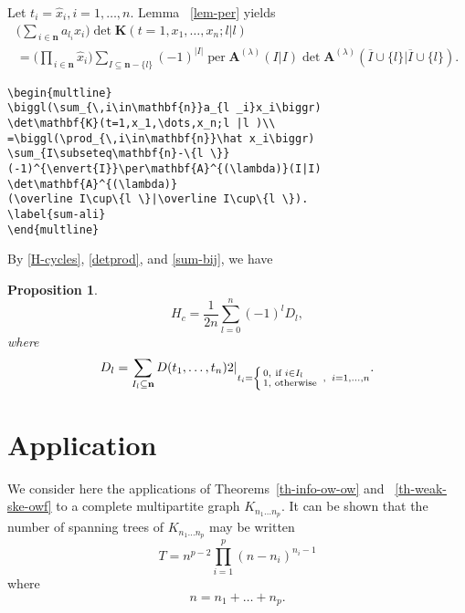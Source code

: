 \documentclass{article}
\newtheorem{prop}[thm]{Proposition}
\theoremstyle{definition}
\theoremstyle{remark}
\DeclareMathOperator{\per}{per}
\newcommand{\eval}[2][\right]{\relax
  \ifx#1\right\relax \left.\fi#2#1\rvert}
\newcommand{\envert}[1]{\left\lvert#1\right\rvert}
\begin{document}
Let $t_i=\hat x_i,i=1,\dots,n$. Lemma ~\ref{lem-per} yields
\begin{multline}
\biggl(\sum_{\,i\in\mathbf{n}}a_{l _i}x_i\biggr)
\det\mathbf{K}(t=1,x_1,\dots,x_n;l |l )\\
=\biggl(\prod_{\,i\in\mathbf{n}}\hat x_i\biggr)
\sum_{I\subseteq\mathbf{n}-\{l \}}
(-1)^{\envert{I}}\per\mathbf{A}^{(\lambda)}(I|I)
\det\mathbf{A}^{(\lambda)}
(\overline I\cup\{l \}|\overline I\cup\{l \}).
\label{sum-ali}
\end{multline}
\begin{verbatim}
\begin{multline}
\biggl(\sum_{\,i\in\mathbf{n}}a_{l _i}x_i\biggr)
\det\mathbf{K}(t=1,x_1,\dots,x_n;l |l )\\
=\biggl(\prod_{\,i\in\mathbf{n}}\hat x_i\biggr)
\sum_{I\subseteq\mathbf{n}-\{l \}}
(-1)^{\envert{I}}\per\mathbf{A}^{(\lambda)}(I|I)
\det\mathbf{A}^{(\lambda)}
(\overline I\cup\{l \}|\overline I\cup\{l \}).
\label{sum-ali}
\end{multline}
\end{verbatim}

By \eqref{H-cycles}, \eqref{detprod}, and \eqref{sum-bij}, we have
\begin{prop}\label{prop:eg}
\begin{equation}
H_c=\frac1{2n}\sum^n_{l =0}(-1)^{l}
D_{l},
\end{equation}
where
\begin{equation}\label{delta-l}
D_{l}=\eval[2]{\sum_{I_{l}\subseteq \mathbf{n}}
D(t_1,\dots,t_n)}_{t_i=\left\{\begin{smallmatrix}
0,& \text{if }i\in I_{l}\quad\\%
1,& \text{otherwise}\end{smallmatrix}\right.\;,\;\; i=1,\dots,n}.
\end{equation}
\end{prop}

\section{Application}
\label{lincomp}

We consider here the applications of Theorems~\ref{th-info-ow-ow} and
~\ref{th-weak-ske-owf} to a complete
multipartite graph $K_{n_1\dots n_p}$. It can be shown that the
number of spanning trees of $K_{n_1\dots n_p}$
may be written
\begin{equation}\label{e:st}
T=n^{p-2}\prod^p_{i=1}
(n-n_i)^{n_i-1}
\end{equation}
where
\begin{equation}
n=n_1+\dots+n_p.
\end{equation}
\end{document}
